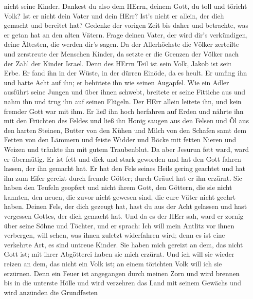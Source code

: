 nicht seine Kinder.  Dankest du also dem HErrn, deinem Gott,
du toll und töricht Volk? Ist er nicht dein Vater und dein HErr? Ist's
nicht er allein, der dich gemacht und bereitet hat?  Gedenke
der vorigen Zeit bis daher und betrachte, was er getan hat an den alten
Vätern. Frage deinen Vater, der wird dir's verkündigen, deine Ältesten,
die werden dir's sagen.  Da der Allerhöchste die Völker
zerteilte und zerstreute der Menschen Kinder, da setzte er die Grenzen
der Völker nach der Zahl der Kinder Israel.  Denn des HErrn
Teil ist sein Volk, Jakob ist sein Erbe.  Er fand ihn in
der Wüste, in der dürren Einöde, da es heult. Er umfing ihn und hatte
Acht auf ihn; er behütete ihn wie seinen Augapfel.  Wie ein
Adler ausführt seine Jungen und über ihnen schwebt, breitete er seine
Fittiche aus und nahm ihn und trug ihn auf seinen Flügeln. 
Der HErr allein leitete ihn, und kein fremder Gott war mit ihm.
 Er ließ ihn hoch herfahren auf Erden und nährte ihn mit
den Früchten des Feldes und ließ ihn Honig saugen aus den Felsen und Öl
aus den harten Steinen,  Butter von den Kühen und Milch von
den Schafen samt dem Fetten von den Lämmern und feiste Widder und Böcke
mit fetten Nieren und Weizen und tränkte ihn mit gutem Traubenblut.
 Da aber Jesurun fett ward, ward er übermütig. Er ist fett
und dick und stark geworden und hat den Gott fahren lassen, der ihn
gemacht hat. Er hat den Fels seines Heils gering geachtet 
und hat ihn zum Eifer gereizt durch fremde Götter; durch Gräuel hat er
ihn erzürnt.  Sie haben den Teufeln geopfert und nicht
ihrem Gott, den Göttern, die sie nicht kannten, den neuen, die zuvor
nicht gewesen sind, die eure Väter nicht geehrt haben. 
Deinen Fels, der dich gezeugt hat, hast du aus der Acht gelassen und
hast vergessen Gottes, der dich gemacht hat.  Und da es der
HErr sah, ward er zornig über seine Söhne und Töchter,  und
er sprach: Ich will mein Antlitz vor ihnen verbergen, will sehen, was
ihnen zuletzt widerfahren wird; denn es ist eine verkehrte Art, es sind
untreue Kinder.  Sie haben mich gereizt an dem, das nicht
Gott ist; mit ihrer Abgötterei haben sie mich erzürnt. Und ich will sie
wieder reizen an dem, das nicht ein Volk ist; an einem törichten Volk
will ich sie erzürnen.  Denn ein Feuer ist angegangen durch
meinen Zorn und wird brennen bis in die unterste Hölle und wird
verzehren das Land mit seinem Gewächs und wird anzünden die Grundfesten
